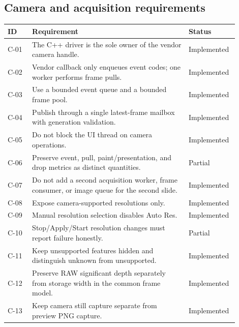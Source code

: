 \documentclass[11pt,a4paper,oneside]{article}
\newcommand{\implemented}{\textsf{Implemented}}
\newcommand{\partialstatus}{\textsf{Partial}}
\begin{document}
\subsection{Camera and acquisition requirements}
\begin{longtable}{p{0.10\linewidth}p{0.64\linewidth}p{0.16\linewidth}}
\toprule
ID & Requirement & Status\\
\midrule
C-01 & The C++ driver is the sole owner of the vendor camera handle. & \implemented\\
C-02 & Vendor callback only enqueues event codes; one worker performs frame pulls. & \implemented\\
C-03 & Use a bounded event queue and a bounded frame pool. & \implemented\\
C-04 & Publish through a single latest-frame mailbox with generation validation. & \implemented\\
C-05 & Do not block the UI thread on camera operations. & \implemented\\
C-06 & Preserve event, pull, paint/presentation, and drop metrics as distinct quantities. & \partialstatus\\
C-07 & Do not add a second acquisition worker, frame consumer, or image queue for the second slide. & \implemented\\
C-08 & Expose camera-supported resolutions only. & \implemented\\
C-09 & Manual resolution selection disables Auto Res. & \implemented\\
C-10 & Stop/Apply/Start resolution changes must report failure honestly. & \partialstatus\\
C-11 & Keep unsupported features hidden and distinguish unknown from unsupported. & \implemented\\
C-12 & Preserve RAW significant depth separately from storage width in the common frame model. & \implemented\\
C-13 & Keep camera still capture separate from preview PNG capture. & \implemented\\
\bottomrule
\end{longtable}
\end{document}
